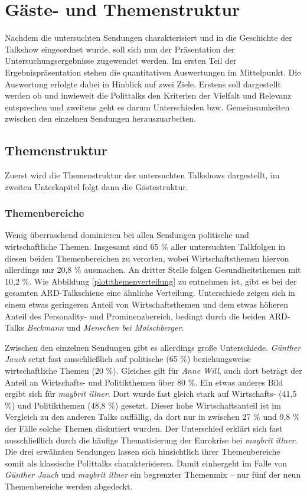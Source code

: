\chapter{Gäste- und Themenstruktur}

Nachdem die untersuchten Sendungen charakterisiert und in die Geschichte der Talkshow eingeordnet wurde, soll sich nun der Präsentation der Untersuchungsergebnisse zugewendet werden. Im ersten Teil der Ergebnispräsentation stehen die quantitativen Auswertungen im Mittelpunkt. Die Auswertung erfolgte dabei in Hinblick auf zwei Ziele. Erstens soll dargestellt werden ob und inwieweit die Polittalks den Kriterien der Vielfalt und Relevanz entsprechen und zweitens geht es darum Unterschieden bzw. Gemeinsamkeiten zwischen den einzelnen Sendungen herauszuarbeiten.

\section{Themenstruktur}

Zuerst wird die Themenstruktur der untersuchten Talkshows dargestellt, im zweiten Unterkapitel folgt dann die Gästestruktur.

\subsection{Themenbereiche}\label{chap:themenbereiche}

Wenig überraschend dominieren bei allen Sendungen politische und wirtschaftliche Themen. Insgesamt sind 65 \% aller untersuchten Talkfolgen in diesen beiden Themenbereichen zu verorten, wobei Wirtschaftsthemen hiervon allerdings nur 20,8 \% ausmachen. An dritter Stelle folgen Gesundheitsthemen mit 10,2 \%. Wie Abbildung \vref{plot:themenverteilung} zu entnehmen ist, gibt es bei der gesamten ARD-Talkschiene eine ähnliche Verteilung. Unterschiede zeigen sich in einem etwas geringeren Anteil von Wirtschaftsthemen und dem etwas höheren Anteil des Personality- und Prominenzbereich, bedingt durch die beiden ARD-Talks \textit{Beckmann} und \textit{Menschen bei Maischberger}.

Zwischen den einzelnen Sendungen gibt es allerdings große Unterschiede. \textit{Günther Jauch} setzt fast ausschließlich auf politische (65 \%) beziehungsweise wirtschaftliche Themen (20 \%). Gleiches gilt für \textit{Anne Will}, auch dort beträgt der Anteil an Wirtschafts- und Politikthemen über 80 \%. Ein etwas anderes Bild ergibt sich für \textit{maybrit illner}. Dort wurde fast gleich stark auf Wirtschafts- (41,5 \%) und Politikthemen (48,8 \%) gesetzt. Dieser hohe Wirtschaftsanteil ist im Vergleich zu den anderen Talks auffällig, da dort nur in zwischen 27 \% und 9,8 \% der Fälle solche Themen diskutiert wurden. Der Unterschied erklärt sich fast ausschließlich durch die häufige Thematisierung der Eurokrise bei \textit{maybrit illner}. Die drei erwähnten Sendungen lassen sich hinsichtlich ihrer Themenbereiche somit als klassische Polittalks charakterisieren. Damit einhergeht im Falle von \textit{Günther Jauch} und \textit{maybrit illner} ein begrenzter Themenmix – nur fünf der neun Themenbereiche werden abgedeckt.

